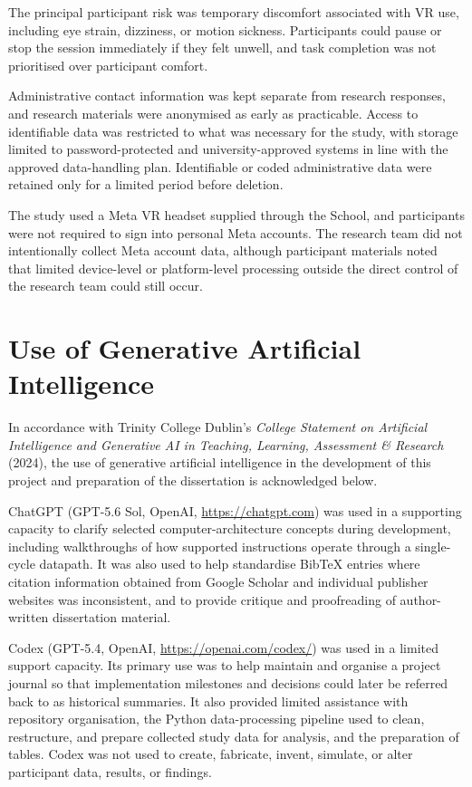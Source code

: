 The principal participant risk was temporary discomfort associated with VR use, including eye strain, dizziness, or motion sickness. Participants could pause or stop the session immediately if they felt unwell, and task completion was not prioritised over participant comfort.

Administrative contact information was kept separate from research responses, and research materials were anonymised as early as practicable. Access to identifiable data was restricted to what was necessary for the study, with storage limited to password-protected and university-approved systems in line with the approved data-handling plan. Identifiable or coded administrative data were retained only for a limited period before deletion.

The study used a Meta VR headset supplied through the School, and participants were not required to sign into personal Meta accounts. The research team did not intentionally collect Meta account data, although participant materials noted that limited device-level or platform-level processing outside the direct control of the research team could still occur.

\section{Use of Generative Artificial Intelligence}

In accordance with Trinity College Dublin's \textit{College Statement on Artificial Intelligence and Generative AI in Teaching, Learning, Assessment \& Research} (2024), the use of generative artificial intelligence in the development of this project and preparation of the dissertation is acknowledged below.

ChatGPT (GPT-5.6 Sol, OpenAI, \url{https://chatgpt.com}) was used in a supporting capacity to clarify selected computer-architecture concepts during development, including walkthroughs of how supported instructions operate through a single-cycle datapath. It was also used to help standardise BibTeX entries where citation information obtained from Google Scholar and individual publisher websites was inconsistent, and to provide critique and proofreading of author-written dissertation material.

Codex (GPT-5.4, OpenAI, \url{https://openai.com/codex/}) was used in a limited support capacity. Its primary use was to help maintain and organise a project journal so that implementation milestones and decisions could later be referred back to as historical summaries. It also provided limited assistance with repository organisation, the Python data-processing pipeline used to clean, restructure, and prepare collected study data for analysis, and the preparation of tables. Codex was not used to create, fabricate, invent, simulate, or alter participant data, results, or findings.

